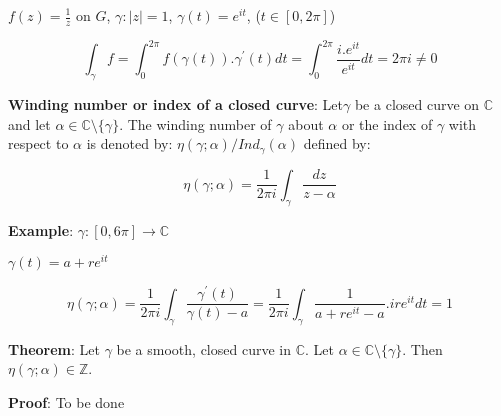 \documentclass{article}
\begin{document}
\begin{flushleft}
$f(z)=\frac{1}{z}$ on $G$, $\gamma: |z|=1$, $\gamma(t)=e^{it}$, ($t\in [0,2\pi]$)

$$\int_{\gamma}^{} f= \int_{0}^{2\pi} f(\gamma(t)).\gamma^{'}(t) dt= \int_{0}^{2\pi} \frac{i.e^{it}}{e^{it}} dt =2\pi i\neq 0$$

\textbf{Winding number or index of a closed curve}:
Let$\gamma$ be a closed curve on $\mathds{C}$ and let $\alpha \in \mathds{C}\setminus \{\gamma\}$. The winding number of $\gamma$ about $\alpha$ or the index of $\gamma$ with respect to $\alpha$ is denoted by:
$\eta(\gamma;\alpha)/Ind_{\gamma}(\alpha)$ defined by:

$$\eta(\gamma;\alpha)=\frac{1}{2\pi i}\int_{\gamma}^{}\frac{dz}{z-\alpha}$$

\textbf{Example}: $\gamma: [0,6\pi]\rightarrow \mathds{C}$ 

$\gamma(t)=a+re^{it}$ 

$$\eta(\gamma;\alpha)=\frac{1}{2\pi i}\int_{\gamma}^{} \frac{\gamma^{'}(t)}{\gamma(t)-a}=\frac{1}{2\pi i}\int_{\gamma}^{} \frac{1}{a+re^{it}-a}.ire^{it} dt=1$$

\textbf{Theorem}: Let $\gamma$ be a smooth, closed curve in $\mathds{C}$. Let $\alpha\in \mathds{C}\setminus \{\gamma\}$. Then $\eta(\gamma;\alpha)\in \mathds{Z}$.

\textbf{Proof}: To be done


\end{flushleft}
\end{document}
